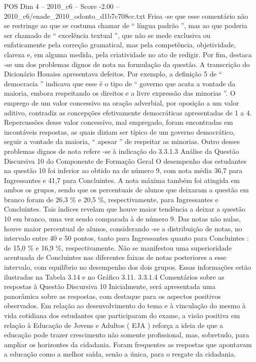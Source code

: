 \begin{textsample}{POS Dim 4 – 2010\_c6 – Score -2.00 – 2010\_c6/enade\_2010\_odonto\_d1b7c708cc.txt}
Frisa -se que esse comentário não se restringe ao que se costuma chamar de “ língua padrão ”, mas ao que poderia ser chamado de “ excelência textual ”, que não se mede exclusiva ou enfaticamente pela correção gramatical, mas pela competência, objetividade, clareza e, em alguma medida, pela criatividade no ato de redigir.
Por fim, destaca -se um dos problemas dignos de nota na formulação da questão.
A transcrição do Dicionário Houaiss apresentava defeitos.
Por exemplo, a definição 5 de “ democracia ” indicava que esse é o tipo de “ governo que acata a vontade da maioria, embora respeitando os direitos e a livre expressão das minorias ”.
O emprego de um valor concessivo na oração adverbial, por oposição a um valor aditivo, contradiz as concepções efetivamente democráticas apresentadas de 1 a 4.
Repercussões desse valor concessivo, mal empregado, foram encontradas em incontáveis respostas, as quais diziam ser típico de um governo democrático, seguir a vontade da maioria, “ apesar ” de respeitar as minorias.
Outro desses problemas dignos de nota refere -se à indicação do 3.3.1.3 Análise da Questão Discursiva 10 do Componente de Formação Geral O desempenho dos estudantes na questão 10 foi inferior ao obtido na de número 9, com nota média 36,7 para Ingressantes e 41,7 para Concluintes.
A nota máxima também foi atingida em ambos os grupos, sendo que os percentuais de alunos que deixaram a questão em branco foram de 26,3 \% e 20,5 \%, respectivamente, para Ingressantes e Concluintes.
Tais índices revelam que houve maior tendência a deixar a questão 10 em branco, uma vez sendo comparada à de número 9.
Das notas não nulas, houve maior percentual de alunos, considerando -se a distribuição de notas, no intervalo entre 40 e 50 pontos, tanto para Ingressantes quanto para Concluintes : de 15,0 \% e 16,9 \%, respectivamente.
Não se manifestou uma superioridade acentuada de Concluintes nas diferentes faixas de notas posteriores a esse intervalo, com equilíbrio no desempenho dos dois grupos.
Essas informações estão ilustradas na Tabela 3.14 e no Gráfico 3.11. 3.3.1.4 Comentários sobre as respostas à Questão Discursiva 10 Inicialmente, será apresentada uma panorâmica sobre as respostas, com destaque para os aspectos positivos observados.
Em relação ao desenvolvimento do tema e à vinculação do mesmo à vida cotidiana dos estudantes que participaram do exame, a visão positiva em relação à Educação de Jovens e Adultos ( EJA ) reforça a ideia de que a educação pode trazer crescimento não somente profissional, mas, sobretudo, para ampliar os horizontes da cidadania.
Foram frequentes as respostas que apontavam a educação como a melhor saída, senão a única, para o resgate da cidadania.

\end{textsample}
